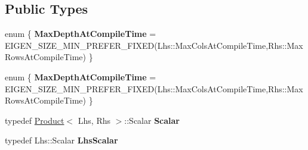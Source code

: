 \subsection*{Public Types}
\begin{DoxyCompactItemize}
\item 
\mbox{\label{struct_eigen_1_1internal_1_1generic__product__impl_3_01_lhs_00_01_rhs_00_01_dense_shape_00_01_def53e16cb724bbb32f6918835a9970bd5_a19813afb9e6bb44c95a87e9922ed183a}} 
enum \{ {\bfseries Max\+Depth\+At\+Compile\+Time} = E\+I\+G\+E\+N\+\_\+\+S\+I\+Z\+E\+\_\+\+M\+I\+N\+\_\+\+P\+R\+E\+F\+E\+R\+\_\+\+F\+I\+X\+ED(Lhs\+:\+:Max\+Cols\+At\+Compile\+Time,Rhs\+:\+:Max\+Rows\+At\+Compile\+Time)
 \}
\item 
\mbox{\label{struct_eigen_1_1internal_1_1generic__product__impl_3_01_lhs_00_01_rhs_00_01_dense_shape_00_01_def53e16cb724bbb32f6918835a9970bd5_a30d946eb43b98e73954119b01bf697d2}} 
enum \{ {\bfseries Max\+Depth\+At\+Compile\+Time} = E\+I\+G\+E\+N\+\_\+\+S\+I\+Z\+E\+\_\+\+M\+I\+N\+\_\+\+P\+R\+E\+F\+E\+R\+\_\+\+F\+I\+X\+ED(Lhs\+:\+:Max\+Cols\+At\+Compile\+Time,Rhs\+:\+:Max\+Rows\+At\+Compile\+Time)
 \}
\item 
\mbox{\label{struct_eigen_1_1internal_1_1generic__product__impl_3_01_lhs_00_01_rhs_00_01_dense_shape_00_01_def53e16cb724bbb32f6918835a9970bd5_a7d3aa92ec37b93990f81bdcf8dd81fa6}} 
typedef \hyperlink{group___core___module_class_eigen_1_1_product}{Product}$<$ Lhs, Rhs $>$\+::Scalar {\bfseries Scalar}
\item 
\mbox{\label{struct_eigen_1_1internal_1_1generic__product__impl_3_01_lhs_00_01_rhs_00_01_dense_shape_00_01_def53e16cb724bbb32f6918835a9970bd5_a069928907f0c060f486ae579898118e4}} 
typedef Lhs\+::\+Scalar {\bfseries Lhs\+Scalar}
\item 
\mbox{\label{struct_eigen_1_1internal_1_1generic__product__impl_3_01_lhs_00_01_rhs_00_01_dense_shape_00_01_def53e16cb724bbb32f6918835a9970bd5_a99e2c53fcc72a0ab1e799b67c244263f}} 

\end{DoxyCompactItemize}
